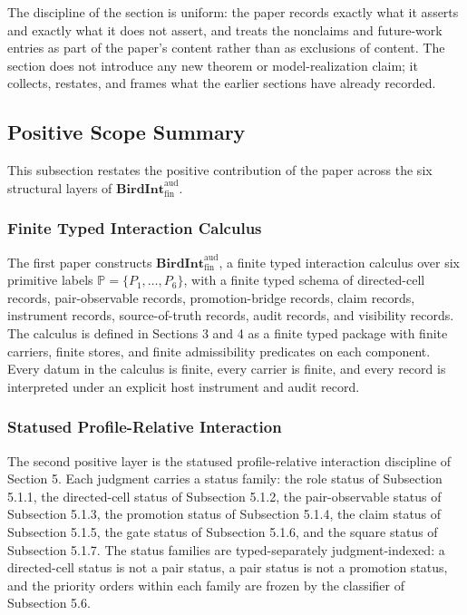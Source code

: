 \documentclass[11pt]{article}
\theoremstyle{definition}
\begin{document}
The discipline of the section is uniform: the paper records exactly what it asserts and exactly what it does not assert, and treats the nonclaims and future-work entries as part of the paper's content rather than as exclusions of content. The section does not introduce any new theorem or model-realization claim; it collects, restates, and frames what the earlier sections have already recorded.

\subsection{Positive Scope Summary}

This subsection restates the positive contribution of the paper across the six structural layers of \(\mathbf{BirdInt}^{\mathrm{aud}}_{\mathrm{fin}}\).

\subsubsection{Finite Typed Interaction Calculus}

The first paper constructs \(\mathbf{BirdInt}^{\mathrm{aud}}_{\mathrm{fin}}\), a finite typed interaction calculus over six primitive labels \(\mathbb P=\{P_{1},\ldots,P_{6}\}\), with a finite typed schema of directed-cell records, pair-observable records, promotion-bridge records, claim records, instrument records, source-of-truth records, audit records, and visibility records. The calculus is defined in Sections 3 and 4 as a finite typed package with finite carriers, finite stores, and finite admissibility predicates on each component. Every datum in the calculus is finite, every carrier is finite, and every record is interpreted under an explicit host instrument and audit record.

\subsubsection{Statused Profile-Relative Interaction}

The second positive layer is the statused profile-relative interaction discipline of Section 5. Each judgment carries a status family: the role status of Subsection 5.1.1, the directed-cell status of Subsection 5.1.2, the pair-observable status of Subsection 5.1.3, the promotion status of Subsection 5.1.4, the claim status of Subsection 5.1.5, the gate status of Subsection 5.1.6, and the square status of Subsection 5.1.7. The status families are typed-separately judgment-indexed: a directed-cell status is not a pair status, a pair status is not a promotion status, and the priority orders within each family are frozen by the classifier of Subsection 5.6.
\end{document}
